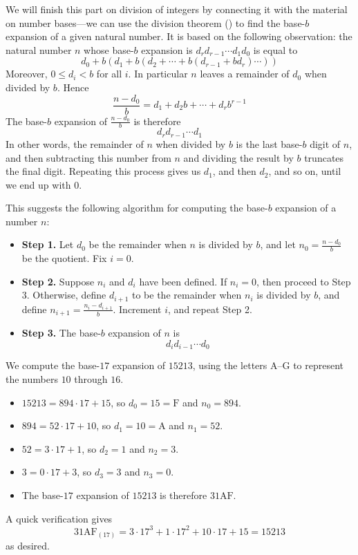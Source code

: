 We will finish this part on division of integers by connecting it with the material on number bases---we can use the division theorem () to find the base-$b$ expansion of a given natural number. It is based on the following observation: the natural number $n$ whose base-$b$ expansion is $d_rd_{r-1} \cdots d_1 d_0$ is equal to
\[ d_0 + b(d_1 + b(d_2 + \cdots + b(d_{r-1} + bd_r) \cdots)) \]
Moreover, $0 \le d_i < b$ for all $i$. In particular $n$ leaves a remainder of $d_0$ when divided by $b$. Hence
\[ \frac{n-d_0}{b} = d_1 + d_2b + \cdots + d_rb^{r-1} \]
The base-$b$ expansion of $\frac{n-d_0}{b}$ is therefore
\[ d_rd_{r-1} \cdots d_1 \]
In other words, the remainder of $n$ when divided by $b$ is the last base-$b$ digit of $n$, and then subtracting this number from $n$ and dividing the result by $b$ truncates the final digit. Repeating this process gives us $d_1$, and then $d_2$, and so on, until we end up with $0$.

This suggests the following algorithm for computing the base-$b$ expansion of a number $n$:
\begin{itemize}
\item \textbf{Step 1.} Let $d_0$ be the remainder when $n$ is divided by $b$, and let $n_0=\frac{n-d_0}{b}$ be the quotient. Fix $i=0$.
\item \textbf{Step 2.} Suppose $n_i$ and $d_i$ have been defined. If $n_i=0$, then proceed to Step 3. Otherwise, define $d_{i+1}$ to be the remainder when $n_i$ is divided by $b$, and define $n_{i+1} = \frac{n_i-d_{i+1}}{b}$. Increment $i$, and repeat Step 2.
\item \textbf{Step 3.} The base-$b$ expansion of $n$ is
\[ d_id_{i-1} \cdots d_0 \]
\end{itemize}

\begin{example}
We compute the base-$17$ expansion of $15213$, using the letters $\mathrm{A}$--$\mathrm{G}$ to represent the numbers $10$ through $16$.
\begin{itemize}
\item $15213 = 894 \cdot 17 + 15$, so $d_0=15=\mathrm{F}$ and $n_0=894$.
\item $894 = 52 \cdot 17 + 10$, so $d_1=10 = \mathrm{A}$ and $n_1=52$.
\item $52 = 3 \cdot 17 + 1$, so $d_2 = 1$ and $n_2=3$.
\item $3 = 0 \cdot 17 + 3$, so $d_3 = 3$ and $n_3=0$.
\item The base-$17$ expansion of $15213$ is therefore $31\mathrm{AF}$.
\end{itemize}
A quick verification gives
\[ 31\mathrm{AF}_{(17)} = 3 \cdot 17^3 + 1 \cdot 17^2 + 10 \cdot 17 + 15 = 15213 \]
as desired.
\end{example}

